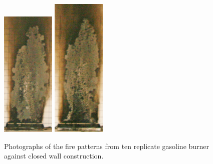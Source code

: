 \documentclass[twoside]{uocthesis}
\begin{document}
\begin{figure}[p]
	\includegraphics[width=1.0in]{../Figures/GBGAS_12_IMG_5775}
	\includegraphics[width=1.0in]{../Figures/GBGAS_13_IMG_5794} \\

	\caption[Photographs of the fire patterns from ten replicate gasoline burner against closed wall construction]{Photographs of the fire patterns from ten replicate gasoline burner against closed wall construction.}
	\label{Gas_Closed_Wall}
\end{figure}
\end{document}
